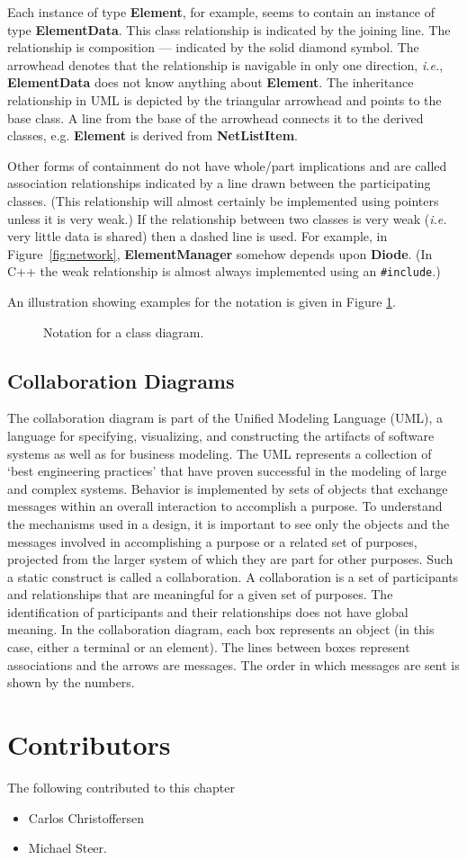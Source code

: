 Each instance of type {\bf Element}, for example, seems to contain an
instance of type {\bf ElementData}.  This class relationship is
indicated by the joining line.  The relationship is composition ---
indicated by the solid diamond symbol.  The arrowhead denotes that the
relationship is navigable in only one direction, \emph{i.e.}, {\bf
ElementData} does not know anything about {\bf Element}.  The
inheritance relationship in UML is depicted by the triangular
arrowhead and points to the base class.  A line from the base of the
arrowhead connects it to the derived classes, e.g. {\bf Element} is
derived from {\bf NetListItem}.

Other forms of containment do not have whole/part implications and are
called association relationships indicated by a line drawn between the
participating classes. (This relationship will almost certainly be
implemented using pointers unless it is very weak.)  If the
relationship between two classes is very weak (\emph{i.e.} very
little data is shared) then a dashed line is used.  For example, in
Figure~\ref{fig:network}, {\bf ElementManager} somehow depends upon {\bf
Diode}.  (In C++ the weak relationship is almost always implemented
using an {\tt \#include}.)

An illustration showing examples for the notation is given in
Figure \ref{fig:classdiag_ex}.
%
\begin{figure}[t]
\centerline{\epsfxsize=13cm }
\caption{Notation for a class diagram.}
\label{fig:classdiag_ex}
\end{figure}
%

\subsection{Collaboration Diagrams}

The collaboration diagram \cite{rational} is part of the Unified
Modeling Language (UML), a language for specifying, visualizing, and
constructing the artifacts of software systems as well as for business
modeling. The UML represents a collection of `best engineering
practices' that have proven successful in the modeling of large and
complex systems. Behavior is implemented by sets of objects that
exchange messages within an overall interaction to accomplish a
purpose. To understand the mechanisms used in a design, it is
important to see only the objects and the messages involved in
accomplishing a purpose or a related set of purposes, projected from
the larger system of which they are part for other purposes. Such a
static construct is called a collaboration. A collaboration is a set
of participants and relationships that are meaningful for a given set
of purposes. The identification of participants and their
relationships does not have global meaning. In the collaboration
diagram, each box represents an object (in this case, either a
terminal or an element). The lines between boxes represent
associations and the arrows are messages. The order in which messages
are sent is shown by the numbers.

\section{Contributors}
The following contributed to this chapter
\begin{itemize}
\item[] Carlos Christoffersen
\item[] Michael Steer.
\end{itemize}
